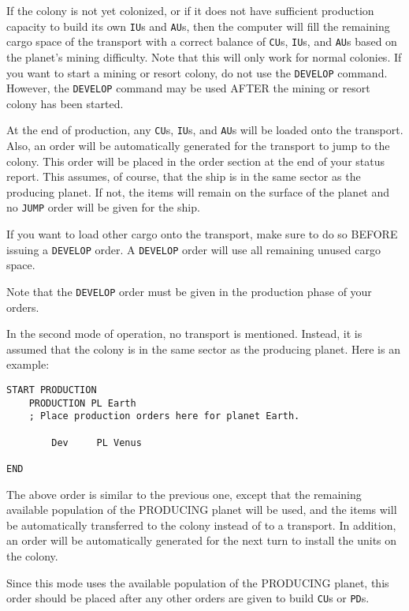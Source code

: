 \documentclass[10pt,titlepage]{article}
\begin{document}
If the colony is not yet colonized, or if it does not have sufficient
production capacity to build its own \texttt{IU}s and \texttt{AU}s, then the computer will fill
the remaining cargo space of the transport with a correct balance of \texttt{CU}s, \texttt{IU}s,
and \texttt{AU}s based on the planet's mining difficulty.  Note that this will only work
for normal colonies.  If you want to start a mining or resort colony, do not
use the \texttt{DEVELOP} command.  However, the \texttt{DEVELOP} command may be used AFTER the
mining or resort colony has been started.

At the end of production, any \texttt{CU}s, \texttt{IU}s, and \texttt{AU}s will be loaded onto the
transport.  Also, an order will be automatically generated for the transport to
jump to the colony. This order will be placed in the order section at the end
of your status report.  This assumes, of course, that the ship is in the same
sector as the producing planet.  If not, the items will remain on the surface
of the planet and no \texttt{JUMP} order will be given for the ship.

If you want to load other cargo onto the transport, make sure to do so BEFORE
issuing a \texttt{DEVELOP} order.  A \texttt{DEVELOP} order will use all remaining unused cargo
space.

Note that the \texttt{DEVELOP} order must be given in the production phase of your
orders.

In the second mode of operation, no transport is mentioned.  Instead, it is
assumed that the colony is in the same sector as the producing planet.  Here
is an example:

\begin{verbatim}
START PRODUCTION
    PRODUCTION PL Earth
    ; Place production orders here for planet Earth.

        Dev     PL Venus

END\end{verbatim} 


The above order is similar to the previous one, except that the remaining
available population of the PRODUCING planet will be used, and the items will
be automatically transferred to the colony instead of to a transport.  In
addition, an order will be automatically generated for the next turn to
install the units on the colony.

Since this mode uses the available population of the PRODUCING planet, this
order should be placed after any other orders are given to build \texttt{CU}s or \texttt{PD}s.
\end{document}
